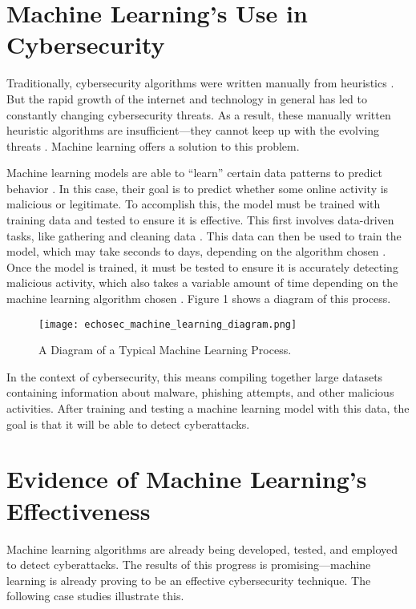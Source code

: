 \section{Machine Learning's Use in Cybersecurity}

Traditionally, cybersecurity algorithms were written manually from heuristics \cite{sarker_kayes_badsha_2020}.
But the rapid growth of the internet and technology in general has led to constantly changing cybersecurity threats.
As a result, these manually written heuristic algorithms are insufficient---they cannot keep up with the evolving threats \cite{sarker_kayes_badsha_2020}.
Machine learning offers a solution to this problem.

Machine learning models are able to ``learn'' certain data patterns to predict behavior \cite{sarker_kayes_badsha_2020}.
In this case, their goal is to predict whether some online activity is malicious or legitimate.
To accomplish this, the model must be trained with training data and tested to ensure it is effective.
This first involves data-driven tasks, like gathering and cleaning data \cite{sarker_kayes_badsha_2020}.
This data can then be used to train the model, which may take seconds to days, depending on the algorithm chosen \cite{xin2018}.
Once the model is trained, it must be tested to ensure it is accurately detecting malicious activity, which also takes a variable amount of time depending on the machine learning algorithm chosen \cite{xin2018}.
Figure 1 shows a diagram of this process.

\begin{figure}[H]
    \centering
    \texttt{[image: echosec\_machine\_learning\_diagram.png]}
    \caption{A Diagram of a Typical Machine Learning Process. \cite{echosec}}
\end{figure}

In the context of cybersecurity, this means compiling together large datasets containing information about malware, phishing attempts, and other malicious activities.
After training and testing a machine learning model with this data, the goal is that it will be able to detect cyberattacks.

\section{Evidence of Machine Learning's Effectiveness}
Machine learning algorithms are already being developed, tested, and employed to detect cyberattacks.
The results of this progress is promising---machine learning is already proving to be an effective cybersecurity technique.
The following case studies illustrate this.

